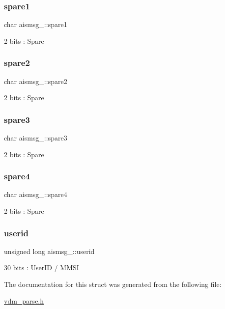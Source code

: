 \subsubsection{\texorpdfstring{spare1}{spare1}}
{\footnotesize\ttfamily char aismsg\+\_\+::spare1}



2 bits \+: Spare 

\mbox{\label{structaismsg__15_a02d1fce5d7d19a977fcd505fd58c0fe9}} 
\subsubsection{\texorpdfstring{spare2}{spare2}}
{\footnotesize\ttfamily char aismsg\+\_\+::spare2}



2 bits \+: Spare 

\mbox{\label{structaismsg__15_a69540d23c6e27a295fab50a7173689df}} 
\subsubsection{\texorpdfstring{spare3}{spare3}}
{\footnotesize\ttfamily char aismsg\+\_\+::spare3}



2 bits \+: Spare 

\mbox{\label{structaismsg__15_ad1023e1bd8b96e3df34537e36075de2b}} 
\subsubsection{\texorpdfstring{spare4}{spare4}}
{\footnotesize\ttfamily char aismsg\+\_\+::spare4}



2 bits \+: Spare 

\mbox{\label{structaismsg__15_a8e938c4246346c4ef8b17f707811eb54}} 
\subsubsection{\texorpdfstring{userid}{userid}}
{\footnotesize\ttfamily unsigned long aismsg\+\_\+::userid}



30 bits \+: User\+ID / M\+M\+SI 



The documentation for this struct was generated from the following file\+:\begin{DoxyCompactItemize}
\item 
\mbox{\hyperlink{vdm__parse_8h}{vdm\+\_\+parse.\+h}}\end{DoxyCompactItemize}
